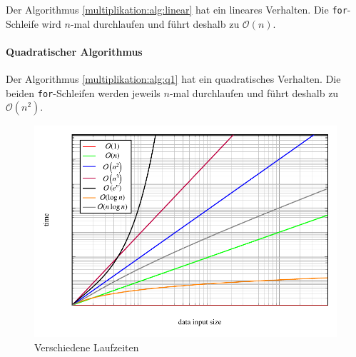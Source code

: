 Der Algorithmus \ref{multiplikation:alg:linear} hat ein lineares Verhalten.
Die \texttt{for}-Schleife wird $n$-mal durchlaufen und f\"uhrt deshalb zu $\mathcal{O}(n)$.

\paragraph{Quadratischer Algorithmus}

Der Algorithmus \ref{multiplikation:alg:q1} hat ein quadratisches Verhalten.
Die beiden \texttt{for}-Schleifen werden jeweils $n$-mal durchlaufen und f\"uhrt deshalb zu $\mathcal{O} (n^2 )$.


\begin{figure}
	\center
	\includegraphics[]{papers/multiplikation/images/bigo}
	\caption{Verschiedene Laufzeiten}
	\label{multiplikation:fig:bigo}
\end{figure}
